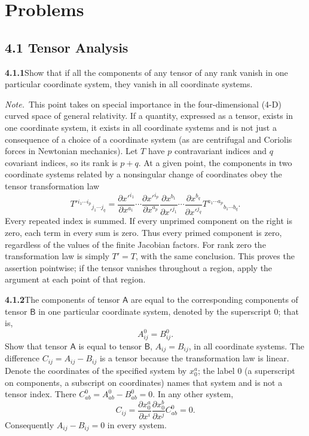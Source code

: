 
\section*{Problems}

\subsection*{4.1 Tensor Analysis}

\par\bigskip
\noindent\textbf{4.1.1}\quad Show that if all the components of any tensor of
any rank vanish in one particular coordinate system, they vanish in all
coordinate systems.

\emph{Note.}~This point takes on special importance in the four-dimensional
(4-D) curved space of general relativity. If a quantity, expressed as a
tensor, exists in one coordinate system, it exists in all coordinate systems
and is not just a consequence of a choice of a coordinate system (as are
centrifugal and Coriolis forces in Newtonian mechanics).
\solution
Let $T$ have $p$ contravariant indices and $q$ covariant indices,
so its rank is $p+q$. At a given point, the components in two coordinate
systems related by a nonsingular change of coordinates obey the tensor
transformation law
\[
T'{}^{i_1\cdots i_p}{}_{j_1\cdots j_q}
=\frac{\partial x'^{i_1}}{\partial x^{a_1}}\cdots
 \frac{\partial x'^{i_p}}{\partial x^{a_p}}
 \frac{\partial x^{b_1}}{\partial x'^{j_1}}\cdots
 \frac{\partial x^{b_q}}{\partial x'^{j_q}}
 T^{a_1\cdots a_p}{}_{b_1\cdots b_q}.
\]
Every repeated index is summed. If every unprimed component on the right
is zero, each term in every sum is zero. Thus every primed component is
zero, regardless of the values of the finite Jacobian factors. For rank
zero the transformation law is simply $T'=T$, with the same conclusion.
This proves the assertion pointwise; if the tensor vanishes throughout a
region, apply the argument at each point of that region.

\par\bigskip
\noindent\textbf{4.1.2}\quad The components of tensor $\mathsf{A}$ are equal
to the corresponding components of tensor $\mathsf{B}$ in one particular
coordinate system, denoted by the superscript $0$; that is,
\[
A_{ij}^{0}=B_{ij}^{0}.
\]
Show that tensor $\mathsf{A}$ is equal to tensor $\mathsf{B}$,
$A_{ij}=B_{ij}$, in all coordinate systems.
\solution
The difference $C_{ij}=A_{ij}-B_{ij}$ is a tensor because the
transformation law is linear. Denote the coordinates of the specified
system by $x_0^a$; the label $0$ (a superscript on components, a
subscript on coordinates) names that system and is not a tensor index.
There $C^0_{ab}=A^0_{ab}-B^0_{ab}=0$. In any other system,
\[
C_{ij}
=\frac{\partial x_0^a}{\partial x^i}
 \frac{\partial x_0^b}{\partial x^j}C^0_{ab}=0.
\]
Consequently $A_{ij}-B_{ij}=0$ in every system.

